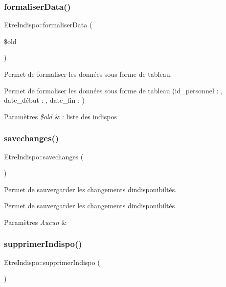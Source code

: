 \subsubsection{\texorpdfstring{formaliser\+Data()}{formaliserData()}}
{\footnotesize\ttfamily Etre\+Indispo\+::formaliser\+Data (\begin{DoxyParamCaption}\item[{}]{\$old }\end{DoxyParamCaption})}



Permet de formaliser les données sous forme de tableau. 

Permet de formaliser les données sous forme de tableau (id\+\_\+personnel \+: , date\+\_\+début \+: , date\+\_\+fin \+: ) 
\begin{DoxyParams}{Paramètres}
{\em \$old} & \+: liste des indispos \\
\hline
\end{DoxyParams}
\mbox{\label{class_etre_indispo_ab404c3ce5a468289a479029a3d5dc970}} 
\subsubsection{\texorpdfstring{savechanges()}{savechanges()}}
{\footnotesize\ttfamily Etre\+Indispo\+::savechanges (\begin{DoxyParamCaption}{ }\end{DoxyParamCaption})}



Permet de sauvergarder les changements d\textquotesingle{}indisponibiltés. 

Permet de sauvergarder les changements d\textquotesingle{}indisponibiltés 
\begin{DoxyParams}{Paramètres}
{\em Aucun} & \\
\hline
\end{DoxyParams}
\mbox{\label{class_etre_indispo_aed2a2b519e434b4f79901c59ea5d06d3}} 
\subsubsection{\texorpdfstring{supprimer\+Indispo()}{supprimerIndispo()}}
{\footnotesize\ttfamily Etre\+Indispo\+::supprimer\+Indispo (\begin{DoxyParamCaption}{ }\end{DoxyParamCaption})}



